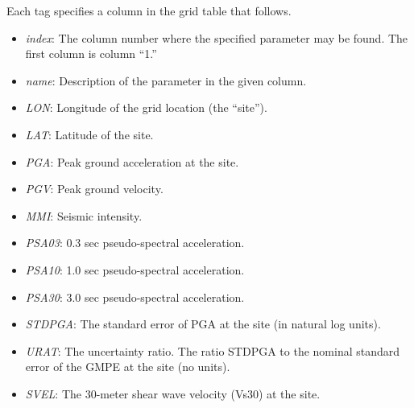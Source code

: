 \documentclass[letterpaper,10pt,english]{sphinxmanual}
\begin{document}
Each tag specifies a column in the grid table that follows.
\begin{itemize}
\item {} 
\emph{index}:  The column number where the specified parameter may be found. The first column is column “1.”

\item {} 
\emph{name}:   Description of the parameter in the given column.

\item {} 
\emph{LON}:    Longitude of the grid location (the “site”).

\item {} 
\emph{LAT}:    Latitude of the site.

\item {} 
\emph{PGA}:    Peak ground acceleration at the site.

\item {} 
\emph{PGV}:    Peak ground velocity.

\item {} 
\emph{MMI}:    Seismic intensity.

\item {} 
\emph{PSA03}:  0.3 sec pseudo-spectral acceleration.

\item {} 
\emph{PSA10}:  1.0 sec pseudo-spectral acceleration.

\item {} 
\emph{PSA30}:  3.0 sec pseudo-spectral acceleration.

\item {} 
\emph{STDPGA}: The standard error of PGA at the site (in natural log units).

\item {} 
\emph{URAT}:   The uncertainty ratio. The ratio STDPGA to the nominal standard error of the GMPE at the site (no units).

\item {} 
\emph{SVEL}:   The 30-meter shear wave velocity (Vs30) at the site.

\end{itemize}
\end{document}

